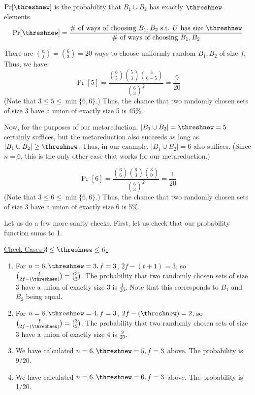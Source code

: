 $\Pr[\threshnew]$ is the probability that $B_1 \cup B_2$ has exactly $\threshnew$ elements.
%
\begin{align}
\Pr[\threshnew] = \frac{\#~\text{of ways of choosing $B_1, B_2$ s.t. $U$ has size $\threshnew$}}{\#~\text{of ways of choosing $B_1, B_2$}}
\end{align}

There are $\binom{n}{f} = \binom{6}{3} = 20$ ways to choose uniformly random $B_1, B_2$ of size $f$.
Thus, we have:
%
\begin{equation}
\Pr[5] =
      \frac{\binom{6}{5} \binom{5}{3} \binom{3}{6 - 5}}{\binom{6}{3}^2} = \frac{9}{20}
  \end{equation}
(Note that $3 \leq 5 \leq \min\{6, 6\}$.)  Thus, the chance that two randomly chosen sets of size 3 have a union of exactly size 5 is 45\%.

Now, for the purposes of our metareduction, $\lvert B_1 \cup B_2 \rvert = \threshnew = 5$ certainly suffices, but the metareduction also succeeds as long as $\lvert B_1 \cup B_2 \rvert \geq \threshnew$.
Thus, in our example, $\lvert B_1 \cup B_2 \rvert = 6$ also suffices. (Since $n = 6$, this is the only other case that works for our metareduction.)

\begin{equation}
\Pr[6] =
      \frac{\binom{6}{6} \binom{6}{3} \binom{3}{0}}{\binom{6}{3}^2} = \frac{1}{20}
  \end{equation}
(Note that $3 \leq 6 \leq \min\{6, 6\}$.)  Thus, the chance that two randomly chosen sets of size 3 have a union of exactly size 6 is 5\%.

  \medskip

  Let us do a few more sanity checks.  First, let us check that our probability function sums to 1.

\medskip
\underline{Check Cases $3 \leq \threshnew \leq 6$:}

\begin{enumerate}

\item For $n = 6, \threshnew = 3, f = 3$, $2f - (t+1) = 3$, so $\binom{f}{2f - (\threshnew)} = \binom{3}{3}$.
The probability that two randomly chosen sets of size 3 have a union of exactly size 3 is $\frac{1}{20}$.
Note that this corresponds to $B_1$ and $B_2$ being equal.

\item For $n = 6, \threshnew = 4, f = 3$, $2f - (\threshnew) = 2$, so $\binom{f}{2f - (\threshnew)} = \binom{3}{2}$.
The probability that two randomly chosen sets of size 3 have a union of exactly size 4 is $\frac{9}{20}$.

\item We have calculated $n = 6, \threshnew = 5, f = 3$ above. The probability is $9/20$.

\item We have calculated $n = 6, \threshnew = 6, f = 3$ above. The probability is 1/20.

\end{enumerate}

